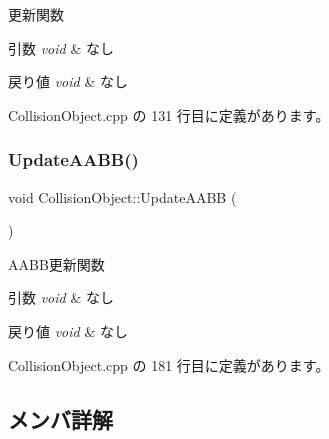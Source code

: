 更新関数 


\begin{DoxyParams}{引数}
{\em void} & なし \\
\hline
\end{DoxyParams}

\begin{DoxyRetVals}{戻り値}
{\em void} & なし \\
\hline
\end{DoxyRetVals}


 Collision\+Object.\+cpp の 131 行目に定義があります。

\mbox{\label{class_collision_object_af2d31d33d299ca9701b93b4dc0294809}} 
\subsubsection{\texorpdfstring{Update\+A\+A\+B\+B()}{UpdateAABB()}}
{\footnotesize\ttfamily void Collision\+Object\+::\+Update\+A\+A\+BB (\begin{DoxyParamCaption}{ }\end{DoxyParamCaption})\hspace{0.3cm}{\ttfamily [private]}}



A\+A\+B\+B更新関数 


\begin{DoxyParams}{引数}
{\em void} & なし \\
\hline
\end{DoxyParams}

\begin{DoxyRetVals}{戻り値}
{\em void} & なし \\
\hline
\end{DoxyRetVals}


 Collision\+Object.\+cpp の 181 行目に定義があります。



\subsection{メンバ詳解}
\mbox{\label{class_collision_object_a2a785df2af0a784ef88e527cc41a7328}} 
